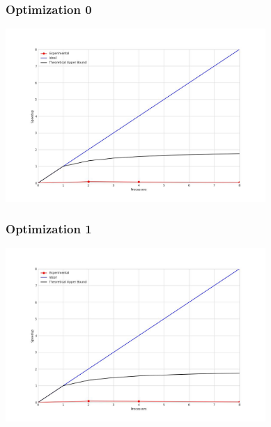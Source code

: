 \subsubsection{Optimization 0}
\begin{center}
    \resizebox{0.8\textwidth}{!}{}
    \includegraphics[width=0.74\textwidth]{../img/speedup-graph_type-tile-820000-O0}
\end{center}

\subsubsection{Optimization 1}
\begin{center}
    \resizebox{0.8\textwidth}{!}{}
    \includegraphics[width=0.74\textwidth]{../img/speedup-graph_type-tile-820000-O1}
\end{center}

\clearpage
